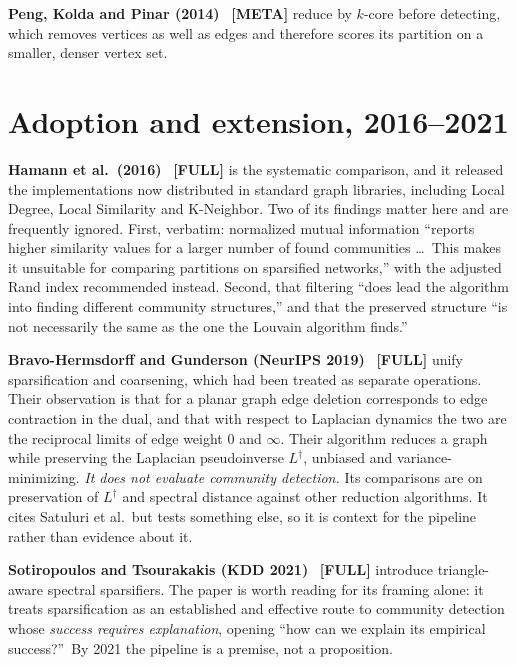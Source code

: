 \documentclass[10pt,a4paper]{article}
\begin{document}
\textbf{Peng, Kolda and Pinar (2014)}~\cite{peng2014accelerating} \textbf{[META]} reduce by
$k$-core before detecting, which removes vertices as well as edges and therefore scores its
partition on a smaller, denser vertex set.

\section{Adoption and extension, 2016--2021}

\textbf{Hamann et al.\ (2016)}~\cite{hamann2016structure} \textbf{[FULL]} is the systematic
comparison, and it released the implementations now distributed in standard graph libraries,
including Local Degree, Local Similarity and K-Neighbor. Two of its findings matter here and are
frequently ignored. First, verbatim: normalized mutual information ``reports higher similarity
values for a larger number of found communities \dots\ This makes it unsuitable for comparing
partitions on sparsified networks,'' with the adjusted Rand index recommended instead. Second,
that filtering ``does lead the algorithm into finding different community structures,'' and that
the preserved structure ``is not necessarily the same as the one the Louvain algorithm finds.''

\textbf{Bravo-Hermsdorff and Gunderson (NeurIPS 2019)}~\cite{hermsdorff2019unifying}
\textbf{[FULL]} unify sparsification and coarsening, which had been treated as separate
operations. Their observation is that for a planar graph edge deletion corresponds to edge
contraction in the dual, and that with respect to Laplacian dynamics the two are the reciprocal
limits of edge weight $0$ and $\infty$. Their algorithm reduces a graph while preserving the
Laplacian pseudoinverse $L^\dagger$, unbiased and variance-minimizing. \emph{It does not evaluate
community detection.} Its comparisons are on preservation of $L^\dagger$ and spectral distance
against other reduction algorithms. It cites Satuluri et al.\ but tests something else, so it is
context for the pipeline rather than evidence about it.

\textbf{Sotiropoulos and Tsourakakis (KDD 2021)}~\cite{sotiropoulos2021triangle} \textbf{[FULL]}
introduce triangle-aware spectral sparsifiers. The paper is worth reading for
its framing alone: it treats sparsification as an established and effective route to community
detection whose \emph{success requires explanation}, opening ``how can we explain its empirical
success?''\ By 2021 the pipeline is a premise, not a proposition.
\end{document}
